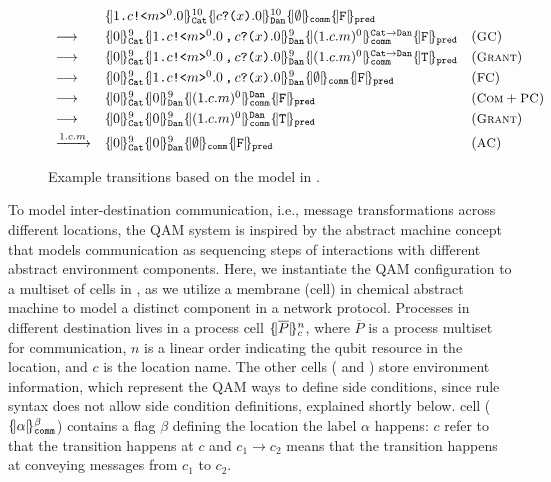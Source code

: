 \begin{figure}[t]
{\footnotesize
\[
\begin{array}{lll}
&
\pcell{\qsend{1}{c}{m}^0.0}{10}{\cn{Cat}}
\pcell{\qrev{c}{x}.0}{10}{\cn{Dan}} 
\qcell{\emptyset}{\cn{comm}}
\qcell{\texttt{F}}{\cn{pred}}
&
\\[0.3em]
\longrightarrow
&
\pcell{0}{9}{\cn{Cat}}
\pcell{\pard{\qsend{1}{c}{m}^0.0}{\qrev{c}{x}.0}}{9}{\cn{Dan}} 
\pcell{(1.c.m)^0}{\cn{Cat}\rightarrow\cn{Dan}}{\cn{comm}}
\qcell{\texttt{F}}{\cn{pred}}
&
(\rulelab{GC})
\\[0.3em]
\longrightarrow
&
\pcell{0}{9}{\cn{Cat}}
\pcell{\pard{\qsend{1}{c}{m}^0.0}{\qrev{c}{x}.0}}{9}{\cn{Dan}} 
\pcell{(1.c.m)^0}{\cn{Cat}\rightarrow\cn{Dan}}{\cn{comm}}
\qcell{\texttt{T}}{\cn{pred}}
&
(\rulelab{Grant})
\\[0.3em]
\longrightarrow
&
\pcell{0}{9}{\cn{Cat}}
\pcell{\pard{\qsend{1}{c}{m}^0.0}{\qrev{c}{x}.0}}{9}{\cn{Dan}} 
\qcell{\emptyset}{\cn{comm}}
\qcell{\texttt{F}}{\cn{pred}}
&
(\rulelab{FC})
\\[0.3em]
\longrightarrow
&
\pcell{0}{9}{\cn{Cat}}
\pcell{0}{9}{\cn{Dan}} 
\pcell{(1.c.m)^0}{\cn{Dan}}{\cn{comm}}
\qcell{\texttt{F}}{\cn{pred}}
&
(\rulelab{Com}+\rulelab{PC})
\\[0.3em]
\longrightarrow
&
\pcell{0}{9}{\cn{Cat}}
\pcell{0}{9}{\cn{Dan}} 
\pcell{(1.c.m)^0}{\cn{Dan}}{\cn{comm}}
\qcell{\texttt{T}}{\cn{pred}}
&
(\rulelab{Grant})
\\[0.3em]
\xrightarrow{1.c.m}&
\pcell{0}{9}{\cn{Cat}}
\pcell{0}{9}{\cn{Dan}} 
\qcell{\emptyset}{\cn{comm}}
\qcell{\texttt{F}}{\cn{pred}}
&
(\rulelab{AC})
\end{array}
\]
}
\caption{Example transitions based on the model in .}
  \label{fig:q-pi-example}
\end{figure}

To model inter-destination communication, i.e., message transformations across different locations,
the QAM system is inspired by the abstract machine concept that models communication as sequencing steps of
interactions with different abstract environment components.
Here, we instantiate the QAM configuration to a multiset of cells in ,
as we utilize a membrane (cell) in chemical abstract machine to model a distinct component in a network protocol.
Processes in different destination lives in a process cell $\{\!| \overline{P} |\!\}^{n}_{c}$, where $\overline{P}$ is a process multiset for communication, $n$ is a linear order indicating the qubit resource in the location, and $c$ is the location name.
The other cells ( and ) store environment information, which represent the QAM ways to define side conditions, since rule syntax does not allow side condition definitions, explained shortly below. 
 cell ($\{\!| \alpha |\!\}^{\beta}_{\texttt{comm}}$) contains a flag $\beta$ defining the location the label $\alpha$ happens: $c$ refer to that the transition happens at $c$ and $c_1\rightarrow c_2$ means that the transition happens at conveying messages from $c_1$ to $c_2$.

